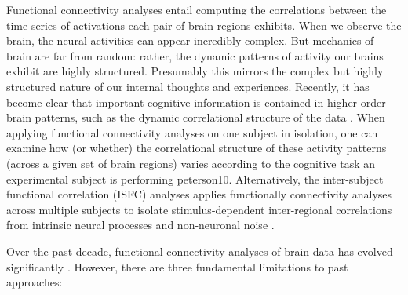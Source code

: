 \documentclass[11pt]{article}
\begin{document}
Functional connectivity analyses entail computing the correlations between the time series of activations each pair of brain regions exhibits. When we observe the brain, the neural activities can appear incredibly complex. But mechanics of brain are far from random: rather, the dynamic patterns of activity our brains exhibit are highly structured. Presumably this mirrors the complex but highly structured nature of our internal thoughts and experiences. Recently, it has become clear that important cognitive information is contained in higher-order brain patterns, such as the dynamic correlational structure of the data \cite{davidson2016}. When applying functional connectivity analyses on one subject in isolation, one can examine how (or whether) the correlational structure of these activity patterns (across a given set of brain regions) varies according to the cognitive task an experimental subject is performing \cite{Turke13}\cite{Rubinov2010}{peterson10}. Alternatively, the inter-subject functional correlation (ISFC) analyses applies functionally connectivity analyses across multiple subjects to isolate stimulus-dependent inter-regional correlations from intrinsic neural processes and non-neuronal noise \cite{hasson2016}\cite{jeremy2017}.

Over the past decade, functional connectivity analyses of brain data has evolved significantly \cite{olaf2005}\cite{khambhati2017}. However, there are three fundamental limitations to past approaches:
\end{document}

